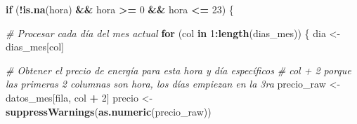\documentclass[
]{article}
\newenvironment{Shaded}{\begin{snugshade}}{\end{snugshade}}
\newcommand{\CommentTok}[1]{\textcolor[rgb]{0.56,0.35,0.01}{\textit{#1}}}
\newcommand{\ControlFlowTok}[1]{\textcolor[rgb]{0.13,0.29,0.53}{\textbf{#1}}}
\newcommand{\DecValTok}[1]{\textcolor[rgb]{0.00,0.00,0.81}{#1}}
\newcommand{\FunctionTok}[1]{\textcolor[rgb]{0.13,0.29,0.53}{\textbf{#1}}}
\newcommand{\NormalTok}[1]{#1}
\newcommand{\OtherTok}[1]{\textcolor[rgb]{0.56,0.35,0.01}{#1}}
\newcommand{\SpecialCharTok}[1]{\textcolor[rgb]{0.81,0.36,0.00}{\textbf{#1}}}
\begin{document}
\begin{Shaded}
\begin{Highlighting}[]
              \ControlFlowTok{if}\NormalTok{ (}\SpecialCharTok{!}\FunctionTok{is.na}\NormalTok{(hora) }\SpecialCharTok{\&\&}\NormalTok{ hora }\SpecialCharTok{\textgreater{}=} \DecValTok{0} \SpecialCharTok{\&\&}\NormalTok{ hora }\SpecialCharTok{\textless{}=} \DecValTok{23}\NormalTok{) \{}
                
                \CommentTok{\# Procesar cada día del mes actual}
                \ControlFlowTok{for}\NormalTok{ (col }\ControlFlowTok{in} \DecValTok{1}\SpecialCharTok{:}\FunctionTok{length}\NormalTok{(dias\_mes)) \{}
\NormalTok{                  dia }\OtherTok{\textless{}{-}}\NormalTok{ dias\_mes[col]}
                  
                  \CommentTok{\# Obtener el precio de energía para esta hora y día específicos}
                  \CommentTok{\# col + 2 porque las primeras 2 columnas son hora, los días empiezan en la 3ra}
\NormalTok{                  precio\_raw }\OtherTok{\textless{}{-}}\NormalTok{ datos\_mes[fila, col }\SpecialCharTok{+} \DecValTok{2}\NormalTok{]}
\NormalTok{                  precio }\OtherTok{\textless{}{-}} \FunctionTok{suppressWarnings}\NormalTok{(}\FunctionTok{as.numeric}\NormalTok{(precio\_raw))}
                  

\end{Highlighting}
\end{Shaded}
\end{document}
